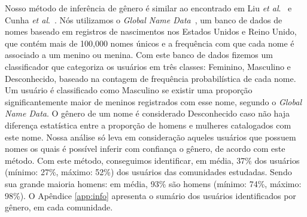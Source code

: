 Nosso método de inferência de gênero é similar ao encontrado em Liu \textit{et al}.~\cite{liu2013s} e Cunha \textit{et al}.~\cite{cunha2014he}. Nós utilizamos o \emph{Global Name Data}~\cite{Hyland:2013:Online}, um banco de dados de nomes baseado em registros de nascimentos nos Estados Unidos e Reino Unido, que contém mais de 100,000 nomes únicos e a frequência com que cada nome é associado a um menino ou menina. Com este banco de dados fizemos um classificador que categoriza os usuários em três classes: Feminino, Masculino e Desconhecido, baseado na contagem de frequência probabilística de cada nome. Um usuário é classificado como Masculino se existir uma proporção significantemente maior de meninos registrados com esse nome, segundo o \emph{Global Name Data}. O gênero de um nome é considerado Desconhecido caso não haja diferença estatística entre a proporção de homens e mulheres catalogados com este nome. Nossa análise só leva em consideração aqueles usuários que possuem nomes os quais é possível inferir com confiança o gênero, de acordo com este método. Com este método, conseguimos identificar, em média, 37\% dos usuários (mínimo: 27\%, máximo: 52\%) dos usuários das comunidades estudadas. Sendo sua grande maioria homens: em média, 93\% são homens (mínimo: 74\%, máximo: 98\%). O Apêndice \ref{app:info} apresenta o sumário dos usuários identificados por gênero, em cada comunidade.



